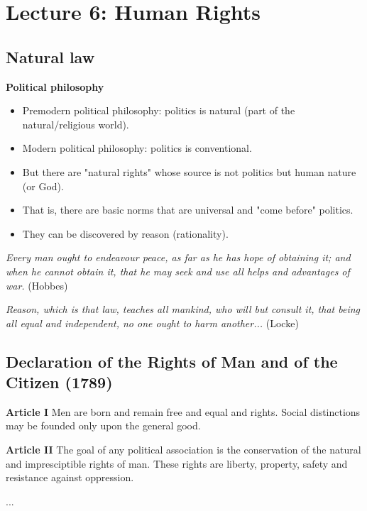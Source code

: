 
\section{Lecture 6: Human Rights}

\subsection{Natural law}

\textbf{Political philosophy}

\begin{itemize}
    \item Premodern political philosophy: politics is natural (part of the
    natural/religious world).
    \item Modern political philosophy: politics is conventional.
    \item But there are "natural rights" whose source is not politics but
    human nature (or God).
    \item That is, there are basic norms that are universal and "come before"
    politics.
    \item They can be discovered by reason (rationality).
\end{itemize}

\textit{Every man ought to endeavour peace, as far as he has hope of
obtaining it; and when he cannot obtain it, that he may seek and use all
helps and advantages of war.} (Hobbes)

\textit{Reason, which is that law, teaches all mankind, who will but consult
it, that being all equal and independent, no one ought to harm another...}
(Locke)

\subsection{Declaration of the Rights of Man and of the Citizen (1789)}

\textbf{Article I} Men are born and remain free and equal and rights. Social
distinctions may be founded only upon the general good.

\textbf{Article II} The goal of any political association is the conservation
of the natural and impresciptible rights of man. These rights are liberty,
property, safety and resistance against oppression.

...

